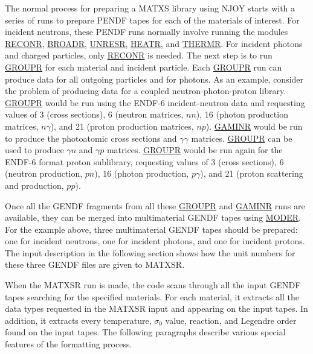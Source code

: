 The normal process for preparing a MATXS library using NJOY starts with
a series of runs to prepare PENDF tapes for each of the materials of
interest. For incident neutrons, these PENDF runs normally involve
running the modules \hyperlink{sRECONRhy}{RECONR},
\hyperlink{sBROADRhy}{BROADR}, \hyperlink{sUNRESRhy}{UNRESR},
\hyperlink{sHEATRhy}{HEATR}, and \hyperlink{sTHERMRhy}{THERMR}.  For
incident photons and charged particles, only
\hyperlink{sRECONRhy}{RECONR} is needed.  The
next step is to run \hyperlink{sGROUPRhy}{GROUPR} for
each material and incident particle.  Each
\hyperlink{sGROUPRhy}{GROUPR} run can produce data
for all outgoing particles and for
photons.  As an example, consider the problem of producing data for a
coupled neutron-photon-proton library.  \hyperlink{sGROUPRhy}{GROUPR}
would be run using the
ENDF-6 incident-neutron data and requesting  values of 3 (cross
sections), 6 (neutron matrices, $nn$), 16 (photon production matrices,
$n\gamma$), and 21 (proton production matrices,
$np$).  \hyperlink{sGAMINRhy}{GAMINR} would be
run to produce the photoatomic cross sections and $\gamma\gamma$
matrices.  \hyperlink{sGROUPRhy}{GROUPR} can be used to
produce $\gamma n$ and $\gamma p$
matrices.  \hyperlink{sGROUPRhy}{GROUPR} would be run again
for the ENDF-6 format proton
sublibrary, requesting  values of 3 (cross sections), 6 (neutron
production, $pn$), 16 (photon production, $p\gamma$), and 21 (proton
scattering and production, $pp$).

Once all the GENDF fragments from all these
\hyperlink{sGROUPRhy}{GROUPR} and
\hyperlink{sGAMINRhy}{GAMINR} runs
are available, they can be merged into multimaterial GENDF tapes using
\hyperlink{sMODERhy}{MODER}.  For the example above,
three multimaterial GENDF tapes should
be prepared: one for incident neutrons, one for incident photons, and
one for incident protons.  The input description in the following
section shows how the unit numbers for these three GENDF files are
given to MATXSR.

When the MATXSR run is made, the
code scans through all the input GENDF
tapes searching for the specified materials.  For each material, it
extracts all the data types requested in the
MATXSR input and appearing
on the input tapes.  In addition, it extracts every temperature,
$\sigma_0$ value, reaction, and Legendre order found on the input tapes.
The following paragraphs describe various special features of the
formatting process.

